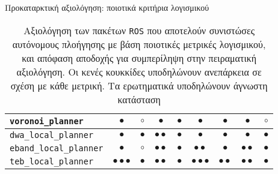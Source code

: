 \begin{frame}{Προκαταρκτική αξιολόγηση: ποιοτικά κριτήρια λογισμικού}
{\begin{table}[h]
\begin{tabular}{lccccccc|c}
  \texttt{voronoi\_planner}            & $\bullet$                 & $\circ$     & $\bullet$         & $\bullet$ & $\bullet$               & $\bullet$        & $\bullet$               & $\circ$      \\ \midrule
  \texttt{dwa\_local\_planner}         & $\bullet$                 & $\bullet$   & $\bullet\bullet$  & $\bullet$ & $\bullet$               & $\bullet$        & $\bullet$               & $\bullet$    \\
  \texttt{eband\_local\_planner}       & $\bullet$                 & $\circ$     & $\bullet\bullet$  & $\bullet$ & $\bullet\bullet$        & $\bullet$        & $\bullet\bullet$        & $\bullet$    \\
  \texttt{teb\_local\_planner}         & $\bullet\bullet\bullet$   & $\bullet$   & $\bullet\bullet$  & $\bullet$ & $\bullet\bullet\bullet$ & $\bullet\bullet$ & $\bullet\bullet$        & $\bullet$    \\ \bottomrule
\end{tabular}
\caption{\tiny Αξιολόγηση των πακέτων \texttt{ROS} που αποτελούν
         συνιστώσες αυτόνομους πλοήγησης με βάση ποιοτικές μετρικές
         λογισμικού, και απόφαση αποδοχής για συμπερίληψη στην πειραματική
         αξιολόγηση. Οι κενές κουκκίδες υποδηλώνουν ανεπάρκεια σε σχέση με
         κάθε μετρική. Τα ερωτηματικά υποδηλώνουν άγνωστη κατάσταση}
\end{table}
}


\end{frame}

